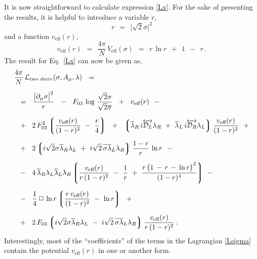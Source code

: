 \documentclass[epsfig,12pt]{article}
\def\beq{\begin{equation}}
\def\eeq{\end{equation}}
\newcommand{\cell}{{\mathcal L}}
\newcommand{\p}{\partial}
\newcommand{\ov}{\overline}
\newcommand{\md}{\mathcal{D}}
\newcommand{\lgr}{\left\lgroup}
\newcommand{\rgr}{\right\rgroup}
\begin{document}
	It is now straightforward to calculate expression \eqref{Lx}. 
	For the sake of presenting the results, it is helpful to introduce a variable $ r $,
\beq
	r    ~~=~~    \big|\sqrt{2}\sigma\big|^2
\eeq
	and a function $ v_\text{eff}(r) $,
\beq
	v_\text{eff}(r)    ~~=~~    \frac{4\pi}{N}\, V_\text{eff}(\sigma)    ~~=~~    r\, \ln r  ~~+~~  1  ~~-~~  r\,.
\eeq
	The result for Eq.~\eqref{Lx} can now be given as,
\begin{align}
%
\notag
	& \frac{4\pi}{N}\, \cell_\text{two deriv}(\sigma, A_\mu, \lambda)    ~~=~~  
	\\[2mm]
%
\notag
	& ~~=~~
	\frac{ \big|\p_\mu \sigma\big|^2 } r
	~~-~~
	F_{03}\, \log\, \frac{\sqrt{2}\sigma}{\sqrt{2}\ov\sigma}
	~~+~~
	v_\text{eff}(r)
	~~-
	\\[2mm]
%
\notag
	&
	~~+~~
	2\, F_{03}^2
	\lgr \frac{v_\text{eff}(r)}{(1 - r)^2}  ~-~  \frac{r}{4} \rgr
	~~+~~
	\lgr 
		\ov\lambda{}_R\, i\overleftrightarrow{\md_L} \lambda_R  ~+~ 
		\ov\lambda{}_L\, i\overleftrightarrow{\md_R} \lambda_L
	\rgr
	\frac{v_\text{eff}(r)}{(1 - r)^2}
	~~+
	\\[2mm]
%
\label{Lsigma}
	&
	~~+~~ 
	2 \lgr
		i\sqrt{2}\sigma\ov\lambda{}_R\lambda_L  ~+~  
		i\sqrt{2}\,\ov{\sigma\lambda}{}_L\lambda_R
	\rgr
	\frac{1 - r}{r}\, \ln r
	~~-
	\\[2mm]
%
\notag
	&
	~~-~~
	4\, \ov\lambda{}_R \lambda_L \ov\lambda{}_L \lambda_R
	\lgr
		\frac{v_\text{eff}(r)}{r\, (1 - r)^2}
		~-~  \frac{1}{r}
		~+~  \frac{r\, \big( 1 \,-\, r \,-\, \ln r \big)^2}{ (1 - r)^4 }
	\rgr
	~-
	\\[2mm]
%
\notag
	&
	~~-~~
	\frac{1}{4}\,\Box\,\ln r
	\lgr
		\frac{r\, v_\text{eff}(r)}{(1 - r)^2}  ~-~  \ln r
	\rgr
	~~+
	\\[2mm]
%
\notag
	&
	~~+~~
	2\, F_{03} \lgr 
			i\sqrt{2}\sigma\ov\lambda{}_R\lambda_L ~-~
			i\sqrt{2}\,\ov{\sigma\lambda}{}_L\lambda_R
		   \rgr
	\frac{v_\text{eff}(r)}{r\, (1 - r)^2}\,.
\end{align}
	Interestingly, most of the ``coefficients'' of the terms in the Lagrangian \eqref{Lsigma} contain 
	the potential $ v_\text{eff}(r) $ in one or another form.


\end{document}
